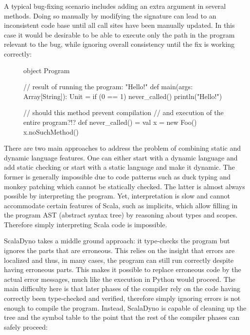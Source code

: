 A typical bug-fixing scenario includes adding an extra argument in several methods. Doing so manually by modifying the signature can lead to an inconsistent code base until all call sites have been manually updated. In this case it would be desirable to be able to execute only the path in the program relevant to the bug, while ignoring overall consistency until the fix is working correctly:

\begin{figure}[t]
\begin{lstlisting-nobreak}
 object Program {
   // result of running the program: "Hello!"
   def main(args: Array[String]): Unit = {
     if (0 == 1)
       never_called()
     println("Hello!")
   }

   // should this method prevent compilation
   // and execution of the entire program?!?
   def never_called() = {
     val x = new Foo()
     x.noSuchMethod()
   }
 }
\end{lstlisting-nobreak}
\vspace{-8mm}
\end{figure}

There are two main approaches to address the problem of combining static and dynamic language features. One can either start with a dynamic language and add static checking or start with a static language and make it dynamic. The former is generally impossible due to code patterns such as duck typing and monkey patching which cannot be statically checked. The latter is almost always possible by interpreting the program. Yet, interpretation is slow and cannot accommodate certain features of Scala, such as implicits, which allow filling in the program AST (abstract syntax tree) by reasoning about types and scopes. Therefore simply interpreting Scala code is impossible.

ScalaDyno takes a middle ground approach: it type-checks the program but ignores the parts that are erroneous. This relies on the insight that errors are localized and thus, in many cases, the program can still run correctly despite having erroneous parts. This makes it possible to replace erroneous code by the actual error messages, much like the execution in Python would proceed. The main difficulty here is that later phases of the compiler rely on the code having correctly been type-checked and verified, therefore simply ignoring errors is not enough to compile the program. Instead, ScalaDyno is capable of cleaning up the tree and the symbol table to the point that the rest of the compiler phases can safely proceed:

